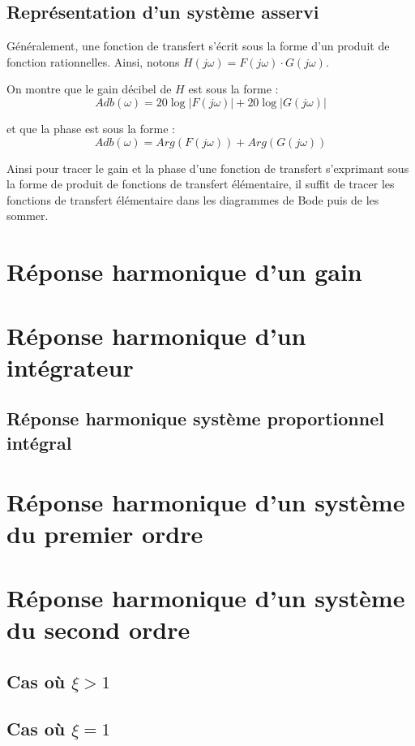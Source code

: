 \documentclass[10pt,oneside]{article}
\begin{document}
\subsection{Représentation d'un système asservi}

Généralement, une fonction de transfert s'écrit sous la forme d'un produit de fonction rationnelles. Ainsi, notons $H(j\omega)=F(j\omega) \cdot G(j\omega)$. 

On montre que le gain décibel de $H$ est sous la forme :
$$
Adb(\omega) = 20 \log |F(j\omega) |+20 \log |G(j\omega) |
$$

et que la phase est sous la forme :
$$
Adb(\omega) = Arg \left(F(j\omega) \right)+Arg \left(G(j\omega) \right)
$$

Ainsi pour tracer le gain et la phase d'une fonction de transfert s'exprimant sous la forme de produit de fonctions de transfert élémentaire, il suffit de tracer les fonctions de transfert élémentaire dans les diagrammes de Bode puis de les sommer.

\section{Réponse harmonique d'un gain}

\section{Réponse harmonique d'un intégrateur}

\subsection{Réponse harmonique système proportionnel intégral}

\section{Réponse harmonique d'un système du premier ordre}

\section{Réponse harmonique d'un système du second ordre}

\subsection{Cas où $\xi>1$}
\subsection{Cas où $\xi=1$}
\end{document}
